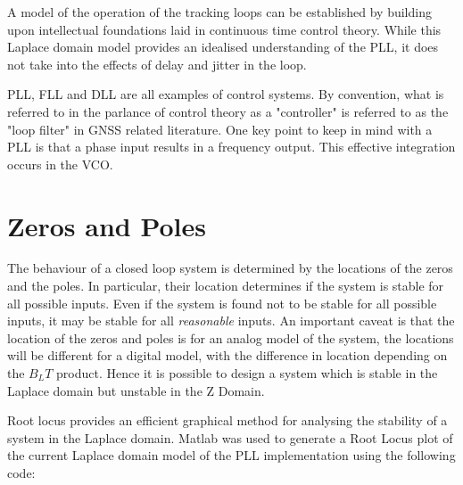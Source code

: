 A model of the operation of the tracking loops can be established by building upon intellectual foundations laid in continuous time control theory. While this Laplace domain model provides an idealised understanding of the \ac{PLL}, it does not take into the effects of delay and jitter in the loop. 

\ac{PLL}, \ac{FLL} and \ac{DLL} are all examples of control systems. By convention, what is referred to in the parlance of control theory as a "controller" is referred to as the "loop filter" in \ac{GNSS} related literature. One key point to keep in mind with a \ac{PLL} is that a phase input results in a frequency output. This effective integration occurs in the \ac{VCO}.

\section{Zeros and Poles}
The behaviour of a closed loop system is determined by the locations of the zeros and the poles. In particular, their location determines if the system is stable for all possible inputs. Even if the system is found not to be stable for all possible inputs, it may be stable for all \emph{reasonable} inputs. An important caveat is that the location of the zeros and poles is for an analog model of the system, the locations will be different for a digital model, with the difference in location depending on the $B_LT$ product.  Hence it is possible to design a system which is stable in the Laplace domain but unstable in the Z Domain. 

Root locus provides an efficient graphical method for analysing the stability of a system in the Laplace domain\cite{Nise}. Matlab was used to generate a Root Locus plot of the current Laplace domain model of the \ac{PLL} implementation using the following code:

\begin{comment}
\begin{lstlisting}[frame=single]
Kvco =1;
Bn = 18;
a3 = 1.1;
b3 = 2.4;
omega = Bn/0.7845;
k1 = b3*omega;
k2 = a3*(omega^2);
k3 = omega^3;
%H is the forward transfer function
H = tf([Kvco*k1 Kvco*k2 Kvco*k3],[1 0 0 0]);
rlocus(H);
\end{lstlisting}
\end{comment}


